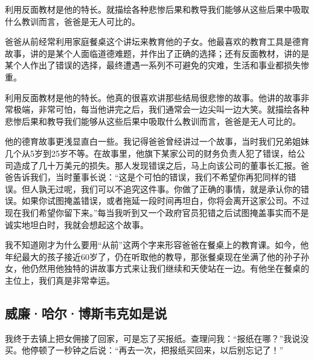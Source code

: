 \begin{WisdomBox}
\par

利用反面教材是他的特长。就描绘各种悲惨后果和教导我们能够从这些后果中吸取什么教训而言，爸爸是无人可比的。
\par
\end{WisdomBox}

爸爸从前经常利用家庭餐桌这个讲坛来教育他的子女。他最喜欢的教育工具是德育故事，讲的是某个人面临道德难题，并作出了正确的选择；还有反面教材，讲的是某个人作出了错误的选择，最终遭遇一系列不可避免的灾难，生活和事业都损失惨重。
\par

利用反面教材是他的特长。他真的很喜欢讲那些结局很悲惨的故事。他讲的故事非常极端，非常可怕，每当他讲完之后，我们通常会一边尖叫一边大笑。就描绘各种悲惨后果和教导我们能够从这些后果中吸取什么教训而言，爸爸是无人可比的。
\par

他的德育故事更浅显直白一些。我记得爸爸曾经讲过一个故事，当时我们兄弟姐妹几个从5岁到25岁不等。在故事里，他旗下某家公司的财务负责人犯了错误，给公司造成了几十万美元的损失。那人发现错误之后，马上向该公司的董事长汇报。爸爸告诉我们，当时董事长说：“这是个可怕的错误，我们不希望你再犯同样的错误。但人孰无过呢，我们可以不追究这件事。你做了正确的事情，就是承认你的错误。如果你试图掩盖错误，或者拖延一段时间再坦白，你将会离开这家公司。不过现在我们希望你留下来。”每当我听到又一个政府官员犯错之后试图掩盖事实而不是诚实地坦白时，我就会想起这个故事。
\par

我不知道刚才为什么要用“从前”这两个字来形容爸爸在餐桌上的教育课。如今，他年纪最大的孩子接近60岁了，仍在听取他的教导，那张餐桌现在坐满了他的孙子孙女，他仍然用他独特的讲故事方式来让我们继续和天使站在一边。有他坐在餐桌的主位上，我们真是非常幸运。
\par

\subsection*{威廉·哈尔·博斯韦克如是说}

\begin{WisdomBox}
\par

我终于去镇上把女佣接了回家，可是忘了买报纸。查理问我：“报纸在哪？”我说没买。他停顿了一秒钟之后说：“再去一次，把报纸买回来，以后别忘记了！”
\par
\end{WisdomBox}


